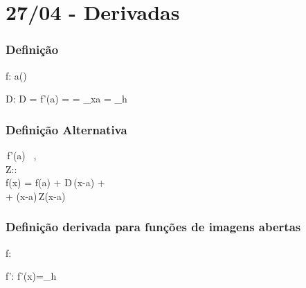 \part{27/04 - Derivadas}

\section{Definição}
\begin{BM}
	f: \to {}
\land
	a\in{}()
\end{BM}\relax

\begin{BM}
	D\in{}:
	D = f'(a) = 
=	\lim_{x\to a}
=	\lim_{h}
\end{BM}
\label{derivadas}

\vspace{5mm}

\begin{multicols}{2}

\noindent%
\begin{minipage}{\linewidth}

\section{Definição Alternativa}

\begin{BM}
	\exists\,f'(a)
\impliedby
	\exists\, \in{},
\\
\quad Z:\to{}:
\\
	f(x) = f(a) + D\,(x-a)
+	\\
+	(x-a)\,Z(x-a)
\end{BM}

\end{minipage}

\vspace{5mm}

\noindent%
\begin{minipage}{\linewidth}

\section{Definição derivada para funções de imagens abertas}

\begin{BM}
	f:\to{}
\land
	\neq\hyperref[feixe]{}
\end{BM}\relax

\begin{BM}
	f':\to{}
	\quad f'(x)=\lim_{h}
\end{BM}

\end{minipage}

\end{multicols}